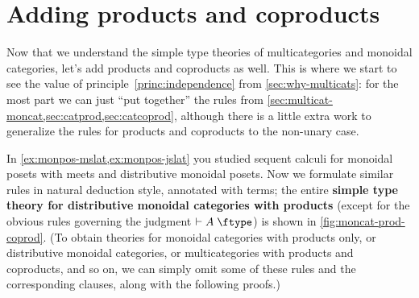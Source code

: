 \documentclass{book}
\let\types\vdash
\def\type{\;\ftype}
\begin{document}
\section{Adding products and coproducts}
\label{sec:multicat-prod-coprod}

Now that we understand the simple type theories of multicategories and monoidal categories, let's add products and coproducts as well.
This is where we start to see the value of principle~\eqref{princ:independence} from \cref{sec:why-multicats}: for the most part we can just ``put together'' the rules from \cref{sec:multicat-moncat,sec:catprod,sec:catcoprod}, although there is a little extra work to generalize the rules for products and coproducts to the non-unary case.

In \cref{ex:monpos-mslat,ex:monpos-jslat} you studied sequent calculi for monoidal posets with meets and distributive monoidal posets.
Now we formulate similar rules in natural deduction style, annotated with terms; the entire \textbf{simple type theory for distributive monoidal categories with products} (except for the obvious rules governing the judgment $\types A\type$) is shown in \cref{fig:moncat-prod-coprod}.
(To obtain theories for monoidal categories with products only, or distributive monoidal categories, or multicategories with products and coproducts, and so on, we can simply omit some of these rules and the corresponding clauses, along with the following proofs.)
\end{document}
